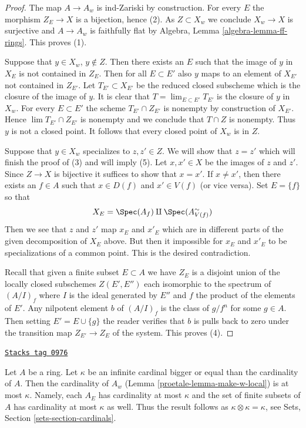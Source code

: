 \begin{proof}
The map $A \to A_w$ is ind-Zariski by construction.
For every $E$ the morphism $Z_E \to X$ is a bijection, hence (2).
As $Z \subset X_w$ we conclude $X_w \to X$ is surjective and
$A \to A_w$ is faithfully flat by
Algebra, Lemma \ref{algebra-lemma-ff-rings}. This proves (1).

\medskip\noindent
Suppose that $y \in X_w$, $y \not \in Z$. Then there
exists an $E$ such that the image of $y$ in $X_E$ is not contained in
$Z_E$. Then for all $E \subset E'$ also $y$ maps to an element of $X_{E'}$
not contained in $Z_{E'}$. Let $T_{E'} \subset X_{E'}$ be the reduced
closed subscheme which is the closure of the image of $y$. It is
clear that $T = \lim_{E \subset E'} T_{E'}$ is the closure of $y$ in $X_w$.
For every $E \subset E'$ the scheme $T_{E'} \cap Z_{E'}$ is nonempty
by construction of $X_{E'}$. Hence $\lim T_{E'} \cap Z_{E'}$ is nonempty
and we conclude that $T \cap Z$ is nonempty. Thus $y$ is not a closed point.
It follows that every closed point of $X_w$ is in $Z$.

\medskip\noindent
Suppose that $y \in X_w$ specializes to $z, z' \in Z$. We will show that
$z = z'$ which will finish the proof of (3) and will imply (5).
Let $x, x' \in X$ be the images of $z$ and $z'$. Since $Z \to X$ is
bijective it suffices to show that $x = x'$. If $x \not = x'$, then
there exists an $f \in A$ such that $x \in D(f)$ and $x' \in V(f)$
(or vice versa). Set $E = \{f\}$ so that
$$
X_E = \Spec(A_f) \amalg \Spec(A_{V(f)}^\sim)
$$
Then we see that $z$ and $z'$ map $x_E$ and $x'_E$ which are in different
parts of the given decomposition of $X_E$ above. But then it impossible
for $x_E$ and $x'_E$ to be specializations of a common point.
This is the desired contradiction.

\medskip\noindent
Recall that given a finite subset $E \subset A$ we have $Z_E$
is a disjoint union of the locally closed subschemes $Z(E', E'')$
each isomorphic to the spectrum of $(A/I)_f$ where $I$ is the ideal
generated by $E''$ and $f$ the product of the elements of $E'$.
Any nilpotent element $b$ of $(A/I)_f$ is the class of $g/f^n$
for some $g \in A$. Then setting $E' = E \cup \{g\}$ the reader
verifies that $b$ is pulls back to zero under the transition map
$Z_{E'} \to Z_E$ of the system. This proves (4).
\end{proof}

\begin{remark}[Size w]
\label{proetale-remark-size-w}
\href{https://stacks.math.columbia.edu/tag/0976}{\texttt{Stacks tag 0976}}

Let $A$ be a ring. Let $\kappa$ be an infinite cardinal bigger or
equal than the cardinality of $A$. Then the cardinality of $A_w$
(Lemma \ref{proetale-lemma-make-w-local})
is at most $\kappa$. Namely, each $A_E$ has cardinality at most
$\kappa$ and the set of finite subsets of $A$ has cardinality at most $\kappa$
as well. Thus the result follows as $\kappa \otimes \kappa = \kappa$, see
Sets, Section \ref{sets-section-cardinals}.
\end{remark}

